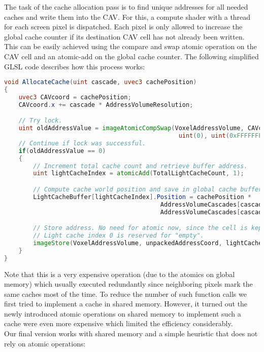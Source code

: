 \documentclass[thesis.tex]{subfiles}
\begin{document}
The task of the cache allocation pass is to find unique addresses for all needed caches and write them into the CAV.
For this, a compute shader with a thread for each screen pixel is dispatched.
Each pixel is only allowed to increase the global cache counter if its destination CAV cell has not already been written.
This can be easily achieved using the compare and swap atomic operation on the CAV cell and an atomic-add on the global cache counter.
The following simplified GLSL code describes how this process works:
\begin{lstlisting}[language=GLSL]
void AllocateCache(uint cascade, uvec3 cachePosition)
{
	uvec3 CAVcoord = cachePosition;
	CAVcoord.x += cascade * AddressVolumeResolution;

	// Try lock.
	uint oldAddressValue = imageAtomicCompSwap(VoxelAddressVolume, CAVcoord, 
                                                uint(0), uint(0xFFFFFFFF));
	// Continue if lock was successful.
	if(oldAddressValue == 0)
	{
		// Increment total cache count and retrieve buffer address.
		uint lightCacheIndex = atomicAdd(TotalLightCacheCount, 1);

		// Compute cache world position and save in global cache buffer.
		LightCacheBuffer[lightCacheIndex].Position = cachePosition *
		                                   AddressVolumeCascades[cascade].WorldVoxelSize +
		                                   AddressVolumeCascades[cascade].Min;

		// Store address. No need for atomic now, since the cell is kept locked.
		// Light cache index 0 is reserved for "empty".
		imageStore(VoxelAddressVolume, unpackedAddressCoord, lightCacheIndex + 1);
	}
}
\end{lstlisting}
Note that this is a very expensive operation (due to the atomics on global memory) which usually executed redundantly since neighboring pixels mark the same caches most of the time.
To reduce the number of such function calls we first tried to implement a cache in shared memory.
However, it turned out the newly introduced atomic operations on shared memory to implement such a cache were even more expensive which limited the efficiency considerably.
\\
Our final version works with shared memory and a simple heuristic that does not rely on atomic operations:
\end{document}
